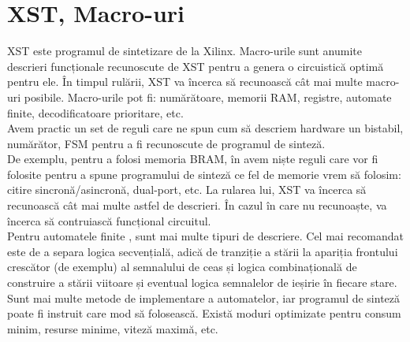 \documentclass[12pt,twoside,a4paper,fleqn]{book}
\begin{document}
\section{XST, Macro-uri}
XST este programul de sintetizare de la Xilinx. Macro-urile sunt anumite descrieri funcționale recunoscute de XST pentru a genera o circuistică optimă pentru ele. În timpul rulării, XST va încerca să recunoască cât mai multe macro-uri posibile. Macro-urile pot fi: numărătoare, memorii RAM, registre, automate finite, decodificatoare prioritare, etc. \cite{xilinx_xst}\\
Avem practic un set de reguli care ne spun cum să descriem hardware un bistabil, numărător, FSM pentru a fi recunoscute de programul de sinteză.\\
De exemplu, pentru a folosi memoria BRAM, în \cite{xilinx_xst} avem niște reguli care vor fi folosite pentru a spune programului de sinteză ce fel de memorie vrem să folosim: citire sincronă/asincronă, dual-port, etc. La rularea lui, XST va încerca să recunoască cât mai multe astfel de descrieri. În cazul în care nu recunoaște, va încerca să contruiască funcțional circuitul.\\
Pentru automatele finite \cite{xilinx_xst, peter_verilog}, sunt mai multe tipuri de descriere. Cel mai recomandat este de a separa logica secvențială, adică de tranziție a stării la apariția frontului crescător (de exemplu) al semnalului de ceas și logica combinațională de construire a stării viitoare și eventual logica semnalelor de ieșirie în fiecare stare. Sunt mai multe metode de implementare a automatelor, iar programul de sinteză poate fi instruit care mod să folosească. Există moduri optimizate pentru consum minim, resurse minime, viteză maximă, etc.
\end{document}
